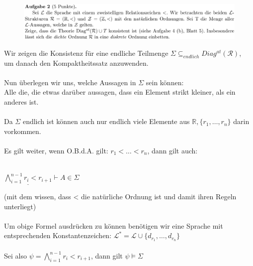 \documentclass[a4paper]{scrartcl}%
\begin{document}

\newpage

\section*{}%
\label{sec:aufgabe_2}

    \begin{figure}[H]
        \includegraphics[scale=0.3]{./A-2.png}
        \label{fig:}
    \end{figure}

    \begin{itemize}
            Wir zeigen die Konsistenz für eine endliche Teilmenge $\Sigma \subseteq_{endlich} Diag^{at}(\mathcal{R})$,\\
            um danach den Kompaktheitssatz anzuwenden.\\
            \\Nun überlegen wir uns, welche Aussagen in $\Sigma$ sein können:\\
            Alle die, die etwas darüber aussagen, dass ein Element strikt kleiner, als ein anderes ist.\\
            \\Da $\Sigma$ endlich ist können auch nur endlich viele Elemente aus $\mathds{R}, \{r_1,\dots,r_n\}$ darin vorkommen.\\
            \\Es gilt weiter, wenn O.B.d.A. gilt: $r_1 < \dots < r_n$, dann gilt auch:\\
            \begin{center}
                \\$\underline{\bigwedge_{i=1}^{n-1} r_i < r_{i+1}} \vdash A \in \Sigma$\\
            \end{center}
            (mit dem wissen, dass < die natürliche Ordnung ist und damit ihren Regeln unterliegt)\\
            \\Um obige Formel ausdrücken zu können benötigen wir eine Sprache mit entsprechenden Konstantenzeichen: 
            $\mathcal{L}^* = \mathcal{L} \cup \{d_{r_1}, \dots, d_{r_n}\}$\\
            \\Sei also $\psi = \bigwedge_{i=1}^{n-1} r_i < r_{i+1}$, dann gilt $\psi \vDash \Sigma$\\

\end{itemize}
\end{document}
